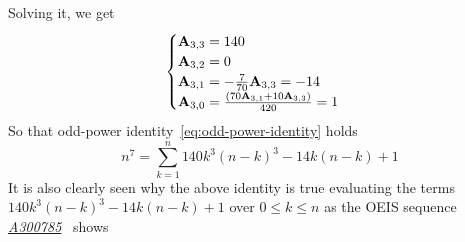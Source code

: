 \begin{examp}
    Solving it, we get
    \begin{equation*}
        \begin{cases}
            {\mathbf{A}} \sb{3,3} = 140 \\
            {\mathbf{A}} \sb{3,2} = 0 \\
            {\mathbf{A}} \sb{3,1} = -\frac{7}{70} {\mathbf{A}} \sb{3,3} = -14 \\
            {\mathbf{A}} \sb{3,0} = \frac{(70 {\mathbf{A}} \sb{3,1} + 10 {\mathbf{A}} \sb{3,3})}{420} = 1
        \end{cases}
    \end{equation*}
    So that odd-power identity~\eqref{eq:odd-power-identity} holds
    \begin{equation*}
        n^7 = \sum_{k=1}^{n} 140 k^3 (n-k)^3 - 14k(n-k) + 1
    \end{equation*}
    It is also clearly seen
    why the above identity is true evaluating the terms $140 k^3 (n-k)^3 - 14k(n-k) + 1$ over $0 \leq k \leq n$ as
    the OEIS sequence \href{https://oeis.org/A300785}{\textit{A300785}}~\cite{kolosov2018seventh} shows
    
\end{examp}
